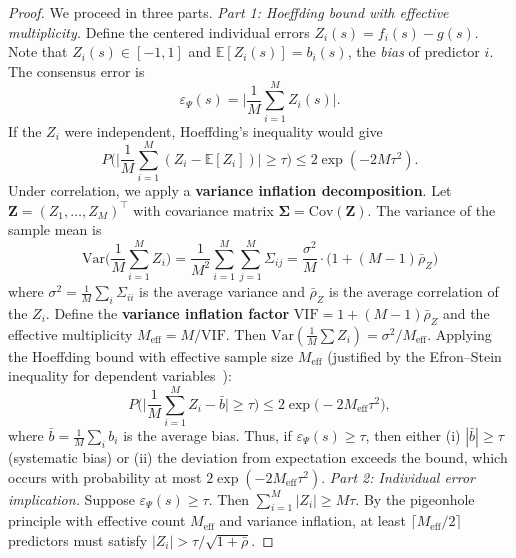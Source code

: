 \documentclass[11pt,a4paper]{article}
\theoremstyle{definition}
\newcommand{\E}{\mathbb{E}}
\newcommand{\Var}{\mathrm{Var}}
\newcommand{\Cov}{\mathrm{Cov}}
\newcommand{\consensus}{\Psi}
\begin{document}
\begin{proof}
We proceed in three parts.
\medskip\noindent\textit{Part 1: Hoeffding bound with effective multiplicity.}
Define the centered individual errors $Z_i(s) = f_i(s) - g(s)$. Note that $Z_i(s) \in [-1, 1]$ and $\E[Z_i(s)] = b_i(s)$, the \textit{bias} of predictor $i$.
The consensus error is
\begin{equation}
    \varepsilon_{\consensus}(s) = \Big|\frac{1}{M}\sum_{i=1}^{M} Z_i(s)\Big|.
\end{equation}
If the $Z_i$ were independent, Hoeffding's inequality would give
\begin{equation}
    P\Big(\Big|\frac{1}{M}\sum_{i=1}^{M} (Z_i - \E[Z_i])\Big| \geq \tau\Big) \leq 2\exp(-2M\tau^2).
\end{equation}
Under correlation, we apply a \textbf{variance inflation decomposition}.
Let $\mathbf{Z} = (Z_1, \dots, Z_M)^\top$ with covariance matrix $\bm{\Sigma} = \Cov(\mathbf{Z})$.
The variance of the sample mean is
\begin{equation}
    \Var\!\Big(\frac{1}{M}\sum_{i=1}^{M} Z_i\Big)
    = \frac{1}{M^2} \sum_{i=1}^{M} \sum_{j=1}^{M} \Sigma_{ij}
    = \frac{\sigma^2}{M} \cdot \Big(1 + (M-1)\bar{\rho}_Z\Big)
\end{equation}
where $\sigma^2 = \frac{1}{M}\sum_i \Sigma_{ii}$ is the average variance and $\bar{\rho}_Z$ is the average correlation of the $Z_i$.
Define the \textbf{variance inflation factor} $\text{VIF} = 1 + (M-1)\bar{\rho}_Z$ and the effective multiplicity $M_{\text{eff}} = M / \text{VIF}$.
Then $\Var(\frac{1}{M}\sum Z_i) = \sigma^2 / M_{\text{eff}}$.
Applying the Hoeffding bound with effective sample size $M_{\text{eff}}$ (justified by the Efron--Stein inequality for dependent variables~\cite{efron1981jackknife}):
\begin{equation}
    P\Big(\Big|\frac{1}{M}\sum_{i=1}^{M} Z_i - \bar{b}\Big| \geq \tau\Big)
    \leq 2\exp\!\Big(-2M_{\text{eff}}\tau^2\Big),
\end{equation}
where $\bar{b} = \frac{1}{M}\sum_i b_i$ is the average bias.
Thus, if $\varepsilon_{\consensus}(s) \geq \tau$, then either (i) $|\bar{b}| \geq \tau$ (systematic bias) or (ii) the deviation from expectation exceeds the bound, which occurs with probability at most $2\exp(-2M_{\text{eff}}\tau^2)$.
\medskip\noindent\textit{Part 2: Individual error implication.}
Suppose $\varepsilon_{\consensus}(s) \geq \tau$. Then $\sum_{i=1}^{M} |Z_i| \geq M\tau$.
By the pigeonhole principle with effective count $M_{\text{eff}}$ and variance inflation, at least $\lceil M_{\text{eff}}/2 \rceil$ predictors must satisfy $|Z_i| > \tau / \sqrt{1+\bar{\rho}}$.

\end{proof}
\end{document}
